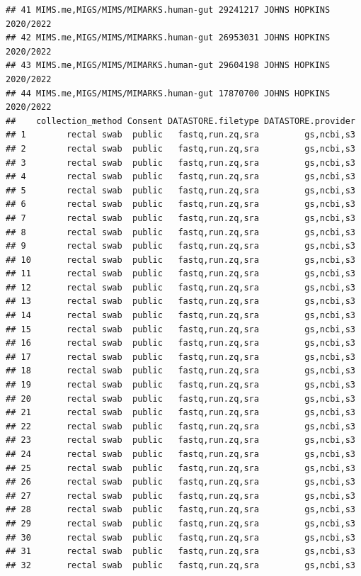 \documentclass[
]{article}
\begin{document}
\begin{verbatim}
## 41 MIMS.me,MIGS/MIMS/MIMARKS.human-gut 29241217 JOHNS HOPKINS       2020/2022
## 42 MIMS.me,MIGS/MIMS/MIMARKS.human-gut 26953031 JOHNS HOPKINS       2020/2022
## 43 MIMS.me,MIGS/MIMS/MIMARKS.human-gut 29604198 JOHNS HOPKINS       2020/2022
## 44 MIMS.me,MIGS/MIMS/MIMARKS.human-gut 17870700 JOHNS HOPKINS       2020/2022
##    collection_method Consent DATASTORE.filetype DATASTORE.provider
## 1        rectal swab  public   fastq,run.zq,sra         gs,ncbi,s3
## 2        rectal swab  public   fastq,run.zq,sra         gs,ncbi,s3
## 3        rectal swab  public   fastq,run.zq,sra         gs,ncbi,s3
## 4        rectal swab  public   fastq,run.zq,sra         gs,ncbi,s3
## 5        rectal swab  public   fastq,run.zq,sra         gs,ncbi,s3
## 6        rectal swab  public   fastq,run.zq,sra         gs,ncbi,s3
## 7        rectal swab  public   fastq,run.zq,sra         gs,ncbi,s3
## 8        rectal swab  public   fastq,run.zq,sra         gs,ncbi,s3
## 9        rectal swab  public   fastq,run.zq,sra         gs,ncbi,s3
## 10       rectal swab  public   fastq,run.zq,sra         gs,ncbi,s3
## 11       rectal swab  public   fastq,run.zq,sra         gs,ncbi,s3
## 12       rectal swab  public   fastq,run.zq,sra         gs,ncbi,s3
## 13       rectal swab  public   fastq,run.zq,sra         gs,ncbi,s3
## 14       rectal swab  public   fastq,run.zq,sra         gs,ncbi,s3
## 15       rectal swab  public   fastq,run.zq,sra         gs,ncbi,s3
## 16       rectal swab  public   fastq,run.zq,sra         gs,ncbi,s3
## 17       rectal swab  public   fastq,run.zq,sra         gs,ncbi,s3
## 18       rectal swab  public   fastq,run.zq,sra         gs,ncbi,s3
## 19       rectal swab  public   fastq,run.zq,sra         gs,ncbi,s3
## 20       rectal swab  public   fastq,run.zq,sra         gs,ncbi,s3
## 21       rectal swab  public   fastq,run.zq,sra         gs,ncbi,s3
## 22       rectal swab  public   fastq,run.zq,sra         gs,ncbi,s3
## 23       rectal swab  public   fastq,run.zq,sra         gs,ncbi,s3
## 24       rectal swab  public   fastq,run.zq,sra         gs,ncbi,s3
## 25       rectal swab  public   fastq,run.zq,sra         gs,ncbi,s3
## 26       rectal swab  public   fastq,run.zq,sra         gs,ncbi,s3
## 27       rectal swab  public   fastq,run.zq,sra         gs,ncbi,s3
## 28       rectal swab  public   fastq,run.zq,sra         gs,ncbi,s3
## 29       rectal swab  public   fastq,run.zq,sra         gs,ncbi,s3
## 30       rectal swab  public   fastq,run.zq,sra         gs,ncbi,s3
## 31       rectal swab  public   fastq,run.zq,sra         gs,ncbi,s3
## 32       rectal swab  public   fastq,run.zq,sra         gs,ncbi,s3

\end{verbatim}
\end{document}
